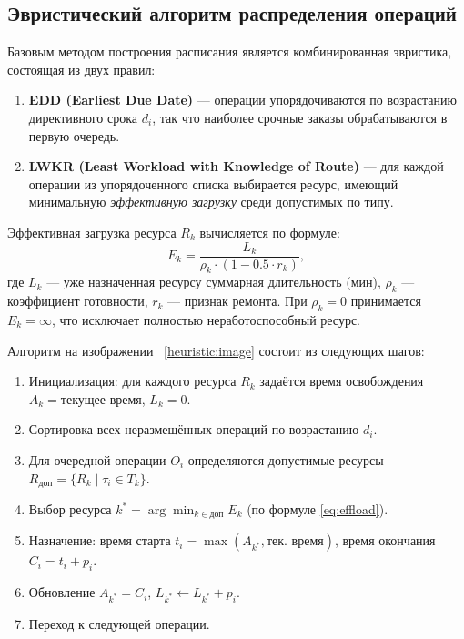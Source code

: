 \subsection{Эвристический алгоритм распределения операций}

Базовым методом построения расписания является комбинированная эвристика, состоящая из двух правил:
\begin{enumerate}
    \item \textbf{EDD (Earliest Due Date)} — операции упорядочиваются по возрастанию директивного срока $d_i$, так что наиболее срочные заказы обрабатываются в первую очередь.
    \item \textbf{LWKR (Least Workload with Knowledge of Route)} — для каждой операции из упорядоченного списка выбирается ресурс, имеющий минимальную \textit{эффективную загрузку} среди допустимых по типу.
\end{enumerate}
Эффективная загрузка ресурса $R_k$ вычисляется по формуле:
\begin{equation}\label{eq:effload}
    E_k = \frac{L_k}{\rho_k \cdot (1 - 0.5 \cdot r_k)},
\end{equation}
где $L_k$ — уже назначенная ресурсу суммарная длительность (мин), $\rho_k$ — коэффициент готовности, $r_k$ — признак ремонта. При $\rho_k = 0$ принимается $E_k = \infty$, что исключает полностью неработоспособный ресурс.

Алгоритм на изображении ~\ref{heuristic:image} состоит из следующих шагов:

\begin{enumerate}
    \item Инициализация: для каждого ресурса $R_k$ задаётся время освобождения $A_k = \text{текущее время}$, $L_k = 0$.
    \item Сортировка всех неразмещённых операций по возрастанию $d_i$.
    \item Для очередной операции $O_i$ определяются допустимые ресурсы $R_{\text{доп}} = \{R_k \mid \tau_i \in T_k\}$.
    \item Выбор ресурса $k^* = \arg\min_{k \in \text{доп}} E_k$ (по формуле \ref{eq:effload}).
    \item Назначение: время старта $t_i = \max(A_{k^*}, \text{тек. время})$, время окончания $C_i = t_i + p_i$.
    \item Обновление $A_{k^*} = C_i$, $L_{k^*} \leftarrow L_{k^*} + p_i$.
    \item Переход к следующей операции.
\end{enumerate}

